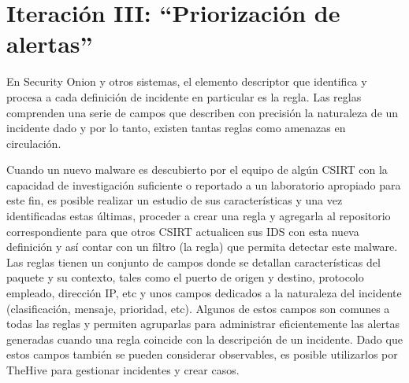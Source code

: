 \chapter{Iteración III: “Priorización de alertas”}
    En Security Onion y otros sistemas, el elemento descriptor que identifica y procesa a cada definición de incidente en particular es la regla. Las reglas comprenden una serie de campos que describen con precisión la naturaleza de un incidente dado y por lo tanto, existen tantas reglas como amenazas en circulación. \par
    Cuando un nuevo malware es descubierto por el equipo de algún CSIRT con la capacidad de investigación suficiente o reportado a un laboratorio apropiado para este fin, es posible realizar un estudio de sus características y una vez identificadas estas últimas, proceder a crear una regla y agregarla al repositorio correspondiente para que otros CSIRT actualicen sus IDS con esta nueva definición y así contar con un filtro (la regla) que permita detectar este malware. Las reglas tienen un conjunto de campos donde se detallan características del paquete y su contexto, tales como el puerto de origen y destino, protocolo empleado, dirección IP, etc y unos campos dedicados a la naturaleza del incidente (clasificación, mensaje, prioridad, etc). Algunos de estos campos son comunes a todas las reglas y permiten agruparlas para administrar eficientemente las alertas generadas cuando una regla coincide con la descripción de un incidente. Dado que estos campos también se pueden considerar observables, es posible utilizarlos por TheHive para gestionar incidentes y crear casos. \par

